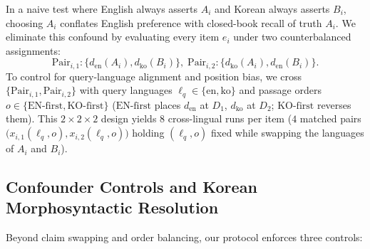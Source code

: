 In a naive test where English always asserts $A_i$ and Korean always asserts $B_i$, choosing $A_i$ conflates English preference with closed-book recall of truth $A_i$. We eliminate this confound by evaluating every item $e_i$ under two counterbalanced assignments:
{\footnotesize
\begin{equation}
\text{Pair}_{i,1}\!:\!\{d_{\text{en}}(A_i),d_{\text{ko}}(B_i)\},\;
\text{Pair}_{i,2}\!:\!\{d_{\text{ko}}(A_i),d_{\text{en}}(B_i)\}.
\label{eq:pairs}
\end{equation}%
}
To control for query-language alignment and position bias, we cross $\{\text{Pair}_{i,1}, \text{Pair}_{i,2}\}$ with query languages $\ell_q \in \{\text{en}, \text{ko}\}$ and passage orders $o \in \{\text{EN-first}, \text{KO-first}\}$ ($\text{EN-first}$ places $d_{\text{en}}$ at $D_1$, $d_{\text{ko}}$ at $D_2$; $\text{KO-first}$ reverses them). This $2 \times 2 \times 2$ design yields $8$ cross-lingual runs per item ($4$ matched pairs $\bigl(x_{i,1}(\ell_q, o), x_{i,2}(\ell_q, o)\bigr)$ holding $(\ell_q, o)$ fixed while swapping the languages of $A_i$ and $B_i$).

\subsection{Confounder Controls and Korean Morphosyntactic Resolution}
\label{subsec:controls}

Beyond claim swapping and order balancing, our protocol enforces three controls:

